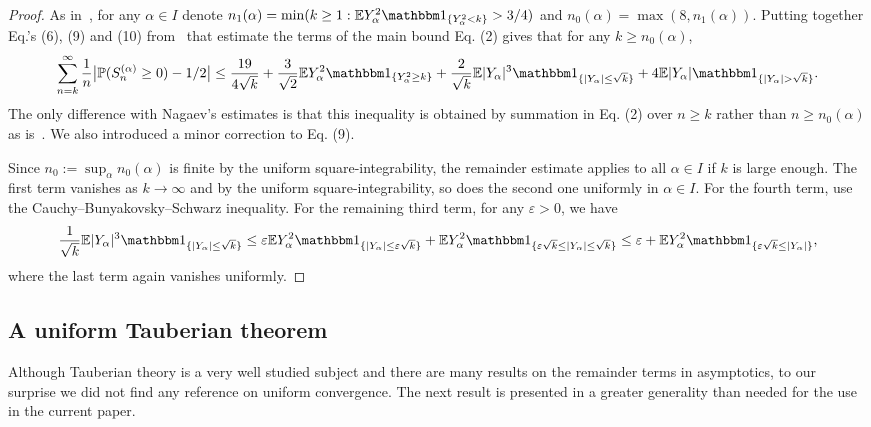 \documentclass[12pt, reqno]{amsart}
\begin{document}
\begin{proof}
As in~\cite{Nagaev2009}, for any $\alpha \in I$ denote $n_1(\alpha) = \min(k \ge 1: \E Y_\alpha^2 \I_{\{ Y_\alpha^2 < k\}}> 3/4)$ and $n_0(\alpha) = \max(8,n_1(\alpha))$. Putting together Eq.'s (6), (9) and (10) from~\cite{Nagaev2009} that estimate the terms of the main bound Eq. (2) gives that for any $k \ge n_0(\alpha)$,
$$\sum_{n=k}^\infty \frac{1}{n} \bigl|\P(S_n^{(\alpha)} \ge 0) -1/2 \bigr| \le \frac{19}{4 \sqrt{k}} + \frac{3}{\sqrt2} \E Y_\alpha^2 \I_{\{ Y_\alpha^2 \ge k\}} + \frac{2}{\sqrt{k}}\E |Y_\alpha|^3 \I_{\{|Y_\alpha| \le \sqrt{k}\}} + 4 \E |Y_\alpha| \I_{\{|Y_\alpha| > \sqrt{k}\}}.$$
The only difference with Nagaev's estimates is that this inequality is obtained by summation in Eq. (2) over $n \ge k$ rather than $n \ge n_0(\alpha)$ as is~\cite{Nagaev2009}. We also introduced a minor correction to Eq. (9). 

Since $n_0:= \sup_\alpha n_0(\alpha)$ is finite by the uniform square-integrability, the remainder estimate applies to all $\alpha \in I$ if $k$ is large enough. The first term vanishes as $ k \to \infty$ and by the uniform square-integrability, so does the second one uniformly in $\alpha \in I$. For the fourth term, use the Cauchy--Bunyakovsky--Schwarz inequality. For the remaining third term, for any $\varepsilon >0$, we have
$$\frac{1}{\sqrt{k}}\E |Y_\alpha|^3 \I_{\{|Y_\alpha| \le \sqrt{k}\}} \le \varepsilon \E Y_\alpha^2 \I_{\{|Y_\alpha| \le \varepsilon \sqrt{k}\}} + \E Y_\alpha^2 \I_{\{\varepsilon \sqrt{k} \le |Y_\alpha| \le \sqrt{k}\}} \le  \varepsilon + \E Y_\alpha^2 \I_{\{\varepsilon \sqrt{k} \le |Y_\alpha| \}},$$ where the last term again vanishes uniformly.
\end{proof}



\subsection*{A uniform Tauberian theorem} Although Tauberian theory is a very well studied subject and there are many results on the remainder terms in asymptotics, to our surprise we did not find any reference on uniform convergence. The next result is presented in a greater generality than needed for the use in the current paper. 
\end{document}
